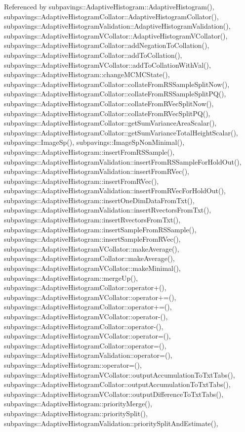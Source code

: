 \-Referenced by subpavings\-::\-Adaptive\-Histogram\-::\-Adaptive\-Histogram(), subpavings\-::\-Adaptive\-Histogram\-Collator\-::\-Adaptive\-Histogram\-Collator(), subpavings\-::\-Adaptive\-Histogram\-Validation\-::\-Adaptive\-Histogram\-Validation(), subpavings\-::\-Adaptive\-Histogram\-V\-Collator\-::\-Adaptive\-Histogram\-V\-Collator(), subpavings\-::\-Adaptive\-Histogram\-Collator\-::add\-Negation\-To\-Collation(), subpavings\-::\-Adaptive\-Histogram\-Collator\-::add\-To\-Collation(), subpavings\-::\-Adaptive\-Histogram\-V\-Collator\-::add\-To\-Collation\-With\-Val(), subpavings\-::\-Adaptive\-Histogram\-::change\-M\-C\-M\-C\-State(), subpavings\-::\-Adaptive\-Histogram\-Collator\-::collate\-From\-R\-S\-Sample\-Split\-Now(), subpavings\-::\-Adaptive\-Histogram\-Collator\-::collate\-From\-R\-S\-Sample\-Split\-P\-Q(), subpavings\-::\-Adaptive\-Histogram\-Collator\-::collate\-From\-R\-Vec\-Split\-Now(), subpavings\-::\-Adaptive\-Histogram\-Collator\-::collate\-From\-R\-Vec\-Split\-P\-Q(), subpavings\-::\-Adaptive\-Histogram\-Collator\-::get\-Sum\-Variance\-Area\-Scalar(), subpavings\-::\-Adaptive\-Histogram\-Collator\-::get\-Sum\-Variance\-Total\-Height\-Scalar(), subpavings\-::\-Image\-Sp(), subpavings\-::\-Image\-Sp\-Non\-Minimal(), subpavings\-::\-Adaptive\-Histogram\-::insert\-From\-R\-S\-Sample(), subpavings\-::\-Adaptive\-Histogram\-Validation\-::insert\-From\-R\-S\-Sample\-For\-Hold\-Out(), subpavings\-::\-Adaptive\-Histogram\-Validation\-::insert\-From\-R\-Vec(), subpavings\-::\-Adaptive\-Histogram\-::insert\-From\-R\-Vec(), subpavings\-::\-Adaptive\-Histogram\-Validation\-::insert\-From\-R\-Vec\-For\-Hold\-Out(), subpavings\-::\-Adaptive\-Histogram\-::insert\-One\-Dim\-Data\-From\-Txt(), subpavings\-::\-Adaptive\-Histogram\-Validation\-::insert\-Rvectors\-From\-Txt(), subpavings\-::\-Adaptive\-Histogram\-::insert\-Rvectors\-From\-Txt(), subpavings\-::\-Adaptive\-Histogram\-::insert\-Sample\-From\-R\-S\-Sample(), subpavings\-::\-Adaptive\-Histogram\-::insert\-Sample\-From\-R\-Vec(), subpavings\-::\-Adaptive\-Histogram\-V\-Collator\-::make\-Average(), subpavings\-::\-Adaptive\-Histogram\-Collator\-::make\-Average(), subpavings\-::\-Adaptive\-Histogram\-V\-Collator\-::make\-Minimal(), subpavings\-::\-Adaptive\-Histogram\-::merge\-Up(), subpavings\-::\-Adaptive\-Histogram\-Collator\-::operator+(), subpavings\-::\-Adaptive\-Histogram\-V\-Collator\-::operator+=(), subpavings\-::\-Adaptive\-Histogram\-Collator\-::operator+=(), subpavings\-::\-Adaptive\-Histogram\-V\-Collator\-::operator-\/(), subpavings\-::\-Adaptive\-Histogram\-Collator\-::operator-\/(), subpavings\-::\-Adaptive\-Histogram\-V\-Collator\-::operator=(), subpavings\-::\-Adaptive\-Histogram\-Collator\-::operator=(), subpavings\-::\-Adaptive\-Histogram\-Validation\-::operator=(), subpavings\-::\-Adaptive\-Histogram\-::operator=(), subpavings\-::\-Adaptive\-Histogram\-V\-Collator\-::output\-Accumulation\-To\-Txt\-Tabs(), subpavings\-::\-Adaptive\-Histogram\-Collator\-::output\-Accumulation\-To\-Txt\-Tabs(), subpavings\-::\-Adaptive\-Histogram\-V\-Collator\-::output\-Difference\-To\-Txt\-Tabs(), subpavings\-::\-Adaptive\-Histogram\-::priority\-Merge(), subpavings\-::\-Adaptive\-Histogram\-::priority\-Split(), subpavings\-::\-Adaptive\-Histogram\-Validation\-::priority\-Split\-And\-Estimate(), 